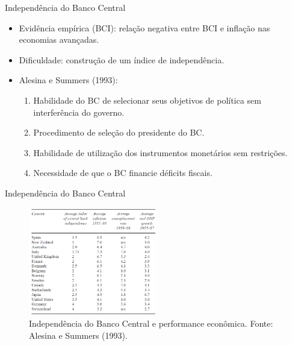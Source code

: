 \documentclass[10pt]{beamer}
\begin{document}
\begin{frame}{Independência do Banco Central}
    \begin{itemize}
        \item Evidência empírica (BCI): relação negativa entre BCI e inflação nas economias avançadas.
        \bigskip
        \item Dificuldade: construção de um índice de independência.
        \bigskip
        \item Alesina e Summers (1993): 
        \begin{enumerate}
            \item Habilidade do BC de selecionar seus objetivos de política sem interferência do governo.
            \bigskip
            \item Procedimento de seleção do presidente do BC.
            \bigskip
            \item Habilidade de utilização dos instrumentos monetários sem restrições.
            \bigskip
            \item Necessidade de que o BC financie déficits fiscais.
        \end{enumerate}
        
    \end{itemize}
\end{frame}

\begin{frame}{Independência do Banco Central}
    \begin{figure}
        \centering
        \includegraphics[width=0.5\textwidth]{./figures/aula12_fig4.PNG}
        \caption{Independência do Banco Central e performance econômica. Fonte: Alesina e Summers (1993).}
        \label{fig4}
    \end{figure}
\end{frame}
\end{document}
